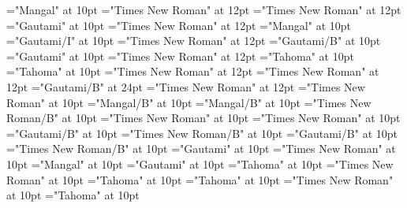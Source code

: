 \documentclass[a4paper]{article}
\begin{document}
 
\pagestyle{plain} 
\sloppy 
\setlength{\parfillskip}{0pt plus 1fil} 
\font\xitemhi="Mangal" at 10pt
\font\xitemxitemcomplexformcomponentsbefore="Times New Roman" at 12pt
\font\xitemxitemcomplexformentrytypebefore="Times New Roman" at 12pt
\font\xitemxitemcomplexformrefheadwordbefore="Gautami" at 10pt
\font\xitemxitemcomplexformrefsbefore="Times New Roman" at 12pt
\font\xitemxitemdefinitionLebefore="Mangal" at 10pt
\font\xitemxitemexamplebefore="Gautami/I" at 10pt
\font\xitemxitemexamplesbefore="Times New Roman" at 12pt
\font\xitemxitemmainentryrefbefore="Gautami/B" at 10pt
\font\xitemxitemmorphformbefore="Gautami" at 10pt
\font\xitemxitemprimaryrefsbefore="Times New Roman" at 12pt
\font\xitemxitempronunciationformbefore="Tahoma" at 10pt
\font\xitemxitempronunciationsbefore="Tahoma" at 10pt
\font\sensesensesensesbefore="Times New Roman" at 12pt
\font{}="Times New Roman" at 12pt
\font{}="Gautami/B" at 24pt
\font{}="Times New Roman" at 12pt
\font\entryletDatadicBody="Times New Roman" at 10pt
\font\reversalformLehientryletDatadicBody="Mangal/B" at 10pt
\font\spanhireversalformLehientryletDatadicBody="Mangal/B" at 10pt
\font\spanenreversalformLehientryletDatadicBody="Times New Roman/B" at 10pt
\font\sensesentryletDatadicBody="Times New Roman" at 10pt
\font\spanensensesentryletDatadicBody="Times New Roman" at 10pt
\font\headrefggoTeluINsensesentryletDatadicBody="Gautami/B" at 10pt
\font\revsensenumberenheadrefggoTeluINsensesentryletDatadicBody="Times New Roman/B" at 10pt
\font\revsensenumberggoTeluINheadrefggoTeluINsensesentryletDatadicBody="Gautami/B" at 10pt
\font\SenseReferenceNumberenheadrefggoTeluINsensesentryletDatadicBody="Times New Roman/B" at 10pt
\font\morphformggoTeluINsensesentryletDatadicBody="Gautami" at 10pt
\font\spanenmorphformggoTeluINsensesentryletDatadicBody="Times New Roman" at 10pt
\font\xitemhimorphformggoTeluINsensesentryletDatadicBody="Mangal" at 10pt
\font\spanggoTeluINmorphformggoTeluINsensesentryletDatadicBody="Gautami" at 10pt
\font\pronunciationssensesentryletDatadicBody="Tahoma" at 10pt
\font\spanenpronunciationssensesentryletDatadicBody="Times New Roman" at 10pt
\font\pronunciationpronunciationssensesentryletDatadicBody="Tahoma" at 10pt
\font\pronunciationformggofonipaxemicpronunciationpronunciationssensesentryletDatadicBody="Tahoma" at 10pt
\font\spanenpronunciationformggofonipaxemicpronunciationpronunciationssensesentryletDatadicBody="Times New Roman" at 10pt
\font\spanggofonipaxemicpronunciationformggofonipaxemicpronunciationpronunciationssensesentryletDatadicBody="Tahoma" at 10pt
\end{document}
